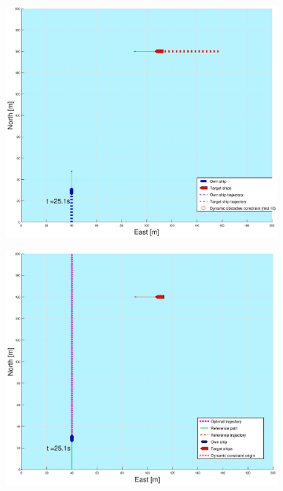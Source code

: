 \begin{figure}[!b]
\begin{subfigure}[b]{0.499\textwidth}
    \end{subfigure}
    \hfill
    \\
    \begin{subfigure}[b]{0.49\textwidth}
        \centering
        \includegraphics[width=\textwidth]{Images/Figures/sving_HO/_Simple_1fig1_time=25}
    \end{subfigure}
    \hfill
    \begin{subfigure}[b]{0.499\textwidth}
        \centering
        \includegraphics[width=\textwidth]{Images/Figures/sving_HO/_Simple_1fig999_time=25}

\end{subfigure}
\end{figure}
